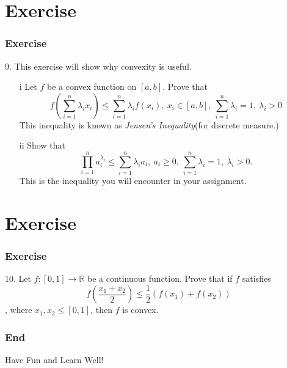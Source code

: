 \documentclass[12pt, t]{beamer}
\renewcommand{\emph}[1]{{\color{Turquoise3}\textsl{#1}}}
\begin{document}
\section{Exercise}
\begin{frame}
    \frametitle{Exercise}
9. This exercise will show why convexity is useful. 
\begin{enumerate}
    \item[i]    Let $f$ be a convex function on $[a,b]$. Prove that 
        \begin{equation*}
            f(\sum^n_{i=1}\lambda_i x_i)\leq \sum^n_{i=1}\lambda_i f(x_i),\ x_i\in[a,b],\ \sum^n_{i=1}\lambda_i=1,\ \lambda_i>0
        \end{equation*}
        This inequality is known as \emph{Jensen's Inequality}(for discrete measure.)
    \item[ii] Show that 
        \begin{equation*}
            \prod^n_{i=1} a_i^{\lambda_i}\leq \sum^n_{i=1}\lambda_i a_i,\ a_i\geq 0,\ \sum^n_{i=1}\lambda_i=1,\ \lambda_i>0.
        \end{equation*}
        This is the inequality you will encounter in your assignment.
\end{enumerate}
\end{frame}

\section{Exercise}
\begin{frame}
    \frametitle{Exercise}
10. Let $f:[0,1]\rightarrow\mathbb{R}$ be a continuous function. Prove that if $f$ satisfies 
\begin{equation*}
    f(\frac{x_1+x_2}{2})\leq \frac{1}{2}(f(x_1)+f(x_2))
\end{equation*}
, where $x_1,x_2\leq[0,1]$, then $f$ is convex.
\end{frame}

\begin{frame}
    \frametitle{End}
    \vspace{2cm}
    \Huge \center  Have Fun and Learn Well!
\end{frame}
\end{document}
